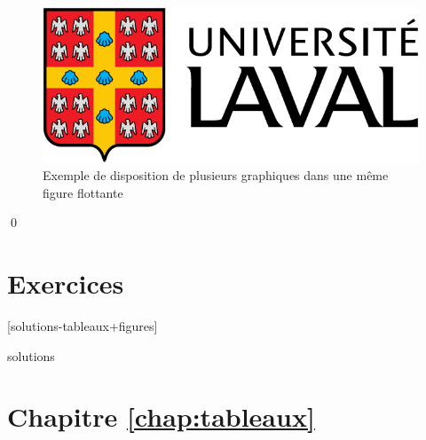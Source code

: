 \begin{exemple}
\begin{figure}
{\begin{minipage}{0.45\linewidth}
      \includegraphics[scale=0.4,angle=45]{ul_p}
    \end{minipage}}
    \hfill
  \caption{Exemple de disposition de plusieurs graphiques dans une
    même figure flottante}
  \label{fig:tableaux:grille}
  \end{figure}
  \qed
\end{exemple}




\section{Exercices}
\label{sec:tableaux:exercices}

[solutions-tableaux+figures]

\begin{Filesave}{solutions}
\section*{Chapitre \ref*{chap:tableaux}}

\end{Filesave}


